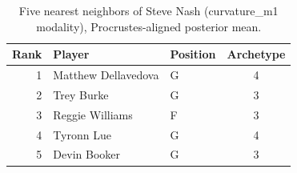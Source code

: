 \begin{table}[htbp]
  \centering\small
  \begin{tabular}{rllc}
    \toprule
    Rank & Player & Position & Archetype \\
    \midrule
    1 & Matthew Dellavedova & G & 4 \\
    2 & Trey Burke & G & 3 \\
    3 & Reggie Williams & F & 3 \\
    4 & Tyronn Lue & G & 4 \\
    5 & Devin Booker & G & 3 \\
    \bottomrule
  \end{tabular}
  \caption{Five nearest neighbors of Steve Nash (curvature_m1 modality), Procrustes-aligned posterior mean.}
  \label{tab:Steve_Nash_neighbors_curvature_m1}
\end{table}

